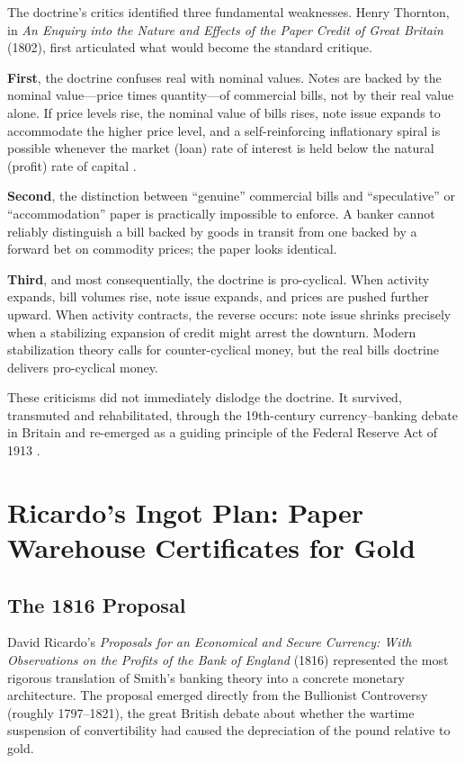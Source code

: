 \documentclass[12pt]{article}
\begin{document}
The doctrine's critics identified three fundamental weaknesses.
Henry Thornton, in \textit{An Enquiry into the Nature and Effects of
the Paper Credit of Great Britain} (1802), first articulated what
would become the standard critique.

\textbf{First}, the doctrine confuses real with nominal values.  Notes
are backed by the nominal value---price times quantity---of commercial
bills, not by their real value alone.  If price levels rise, the
nominal value of bills rises, note issue expands to accommodate the
higher price level, and a self-reinforcing inflationary spiral is
possible whenever the market (loan) rate of interest is held below the
natural (profit) rate of capital \citep{Thornton1802}.

\textbf{Second}, the distinction between ``genuine'' commercial bills
and ``speculative'' or ``accommodation'' paper is practically
impossible to enforce.  A banker cannot reliably distinguish a bill
backed by goods in transit from one backed by a forward bet on
commodity prices; the paper looks identical.

\textbf{Third}, and most consequentially, the doctrine is
pro-cyclical.  When activity expands, bill volumes rise, note issue
expands, and prices are pushed further upward.  When activity
contracts, the reverse occurs: note issue shrinks precisely when
a stabilizing expansion of credit might arrest the downturn.  Modern
stabilization theory calls for counter-cyclical money, but the real
bills doctrine delivers pro-cyclical money.

These criticisms did not immediately dislodge the doctrine.  It
survived, transmuted and rehabilitated, through the 19th-century
currency--banking debate in Britain and re-emerged as a guiding
principle of the Federal Reserve Act of 1913
\citep{Fetter1965, Humphrey2001}.

\section{Ricardo's Ingot Plan: Paper Warehouse Certificates for Gold}
\label{sec:ricardo}

\subsection{The 1816 Proposal}

David Ricardo's \textit{Proposals for an Economical and Secure
Currency: With Observations on the Profits of the Bank of England}
(1816) represented the most rigorous translation of Smith's banking
theory into a concrete monetary architecture.  The proposal emerged
directly from the Bullionist Controversy (roughly 1797--1821), the
great British debate about whether the wartime suspension of
convertibility had caused the depreciation of the pound relative
to gold.
\end{document}
